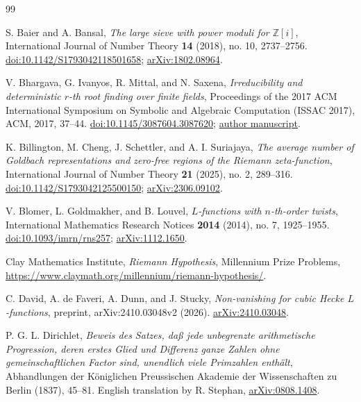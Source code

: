 \begin{thebibliography}{99}

S. Baier and A. Bansal,
\emph{The large sieve with power moduli for $\mathbb Z[i]$},
International Journal of Number Theory \textbf{14} (2018), no. 10,
2737--2756.
\href{https://doi.org/10.1142/S1793042118501658}{doi:10.1142/S1793042118501658};
\href{https://arxiv.org/abs/1802.08964}{arXiv:1802.08964}.

V. Bhargava, G. Ivanyos, R. Mittal, and N. Saxena,
\emph{Irreducibility and deterministic $r$-th root finding over finite fields},
Proceedings of the 2017 ACM International Symposium on Symbolic and
Algebraic Computation (ISSAC 2017), ACM, 2017, 37--44.
\href{https://doi.org/10.1145/3087604.3087620}{doi:10.1145/3087604.3087620};
\href{https://www.cse.iitk.ac.in/users/nitin/papers/irred-and-rth-root.pdf}{author manuscript}.

K. Billington, M. Cheng, J. Schettler, and A. I. Suriajaya,
\emph{The average number of Goldbach representations and zero-free regions
of the Riemann zeta-function},
International Journal of Number Theory \textbf{21} (2025), no. 2, 289--316.
\href{https://doi.org/10.1142/S1793042125500150}{doi:10.1142/S1793042125500150};
\href{https://arxiv.org/abs/2306.09102}{arXiv:2306.09102}.

V. Blomer, L. Goldmakher, and B. Louvel,
\emph{$L$-functions with $n$-th-order twists},
International Mathematics Research Notices \textbf{2014} (2014), no. 7,
1925--1955.
\href{https://doi.org/10.1093/imrn/rns257}{doi:10.1093/imrn/rns257};
\href{https://arxiv.org/abs/1112.1650}{arXiv:1112.1650}.

Clay Mathematics Institute,
\emph{Riemann Hypothesis}, Millennium Prize Problems,
\url{https://www.claymath.org/millennium/riemann-hypothesis/}.

C. David, A. de Faveri, A. Dunn, and J. Stucky,
\emph{Non-vanishing for cubic Hecke $L$-functions},
preprint, arXiv:2410.03048v2 (2026).
\href{https://arxiv.org/abs/2410.03048}{arXiv:2410.03048}.

P. G. L. Dirichlet,
\emph{Beweis des Satzes, da\ss{} jede unbegrenzte arithmetische
Progression, deren erstes Glied und Differenz ganze Zahlen ohne
gemeinschaftlichen Factor sind, unendlich viele Primzahlen enth\"alt},
Abhandlungen der K\"oniglichen Preussischen Akademie der Wissenschaften
zu Berlin (1837), 45--81.
English translation by R. Stephan,
\href{https://arxiv.org/abs/0808.1408}{arXiv:0808.1408}.


\end{thebibliography}
